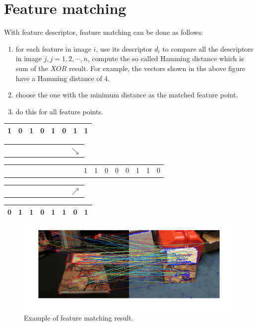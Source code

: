\documentclass[a4paper]{article}
\begin{document}
\section{Feature matching}
With feature descriptor, feature matching can be done as follows:
 \begin{enumerate}
 	\item for each feature in image $i$, use its descriptor $d_i$ to compare all the descriptors in image $j, j=1,2,\cdots,n$, compute the so called Hamming distance which is sum of the $XOR$ result. For example, the vectors shown in the above figure have a Hamming distance of $4$.
 	\item choose the one with the minimum distance as the matched feature point.
 	\item do this for all feature points.
 \end{enumerate}
 \begin{table}
 	\begin{tabular}{|c|c|c|c|c|c|c|c|}
 		\hline
 	{1} & {0} & {1} & {0} & {1} & {0} & {1} & {1} \\
 		\hline
 \end{tabular} \newline
 	\begin{tabular}{cccccccccc}
	{ } & { } & { } & { } & { } & { } & { } & { } & { } &{$\searrow$} \\
	 \end{tabular} \newline
  	\begin{tabular}{ccccccccccc|c|c|c|c|c|c|c|c|}
 	{ } & { } & { } & { } & { } & { } & { } & { } & { } &{} & { } & {1} & {1} & {0} & {0} & {0} & {1} & {1} &{0} 
 \end{tabular} \newline
  	\begin{tabular}{cccccccccc}
 	{ } & { } & { } & { } & { } & { } & { } & { } & { } &{$\nearrow$} \\
 \end{tabular} \newline
\begin{tabular}{|c|c|c|c|c|c|c|c|}
	\hline
	 	0                     & 1                     & 1                     & 0                     & 1                     & 1                     & 0                     & 1    \\
	 	\hline
\end{tabular} 
 \end{table}
% 
%
\begin{figure}[!b]
	\centering
	\includegraphics[scale=0.3]{figures/fast.png}
	\caption{Example of feature matching result.}
\end{figure}
\end{document}
